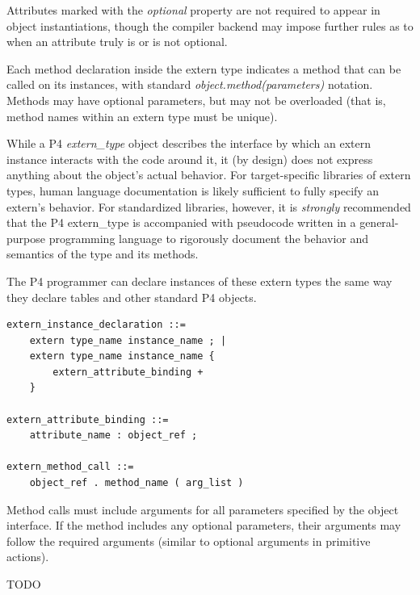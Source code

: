 \documentclass[12pt]{article}
\begin{document}
Attributes marked with the \textit{optional} property are not required to
appear in object instantiations, though the compiler backend may impose further
rules as to when an attribute truly is or is not optional.

Each method declaration inside the extern type indicates a method that can be
called on its instances, with standard \textit{object.method(parameters)} 
notation. Methods may have optional parameters, but may not be overloaded (that
is, method names within an extern type must be unique).

While a P4 \textit{extern_type} object describes the interface by which an
extern instance interacts with the code around it, it (by design) does not
express anything about the object's actual behavior. For target-specific
libraries of extern types, human language documentation is likely sufficient 
to fully specify an extern's behavior. For standardized libraries, however,
it is \textit{strongly} recommended that the P4 extern_type is accompanied
with pseudocode written in a general-purpose programming language to rigorously 
document the behavior and semantics of the type and its methods.


The P4 programmer can declare instances of these extern types the same way they
declare tables and other standard P4 objects.

\begin{lstlisting}[style=BNFstyle]
extern_instance_declaration ::= 
    extern type_name instance_name ; |
    extern type_name instance_name { 
        extern_attribute_binding +
    }

extern_attribute_binding ::=
    attribute_name : object_ref ;

extern_method_call ::= 
    object_ref . method_name ( arg_list )
\end{lstlisting}

Method calls must include arguments for all parameters specified by the
object interface. If the method includes any optional parameters, their
arguments may follow the required arguments (similar to optional arguments
in primitive actions).




TODO

\end{document}
